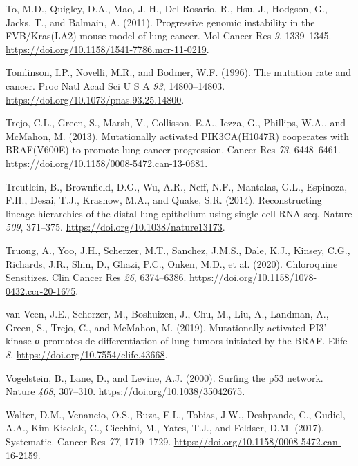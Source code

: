 \begin{CSLReferences}{0}{0}
\leavevmode{}%
To, M.D., Quigley, D.A., Mao, J.-H., Del Rosario, R., Hsu, J., Hodgson, G., Jacks, T., and Balmain, A. (2011). Progressive genomic instability in the FVB/Kras(LA2) mouse model of lung cancer. Mol Cancer Res \emph{9}, 1339--1345. \url{https://doi.org/10.1158/1541-7786.mcr-11-0219}.

\leavevmode{}%
Tomlinson, I.P., Novelli, M.R., and Bodmer, W.F. (1996). The mutation rate and cancer. Proc Natl Acad Sci U S A \emph{93}, 14800--14803. \url{https://doi.org/10.1073/pnas.93.25.14800}.

\leavevmode{}%
Trejo, C.L., Green, S., Marsh, V., Collisson, E.A., Iezza, G., Phillips, W.A., and McMahon, M. (2013). Mutationally activated PIK3CA(H1047R) cooperates with BRAF(V600E) to promote lung cancer progression. Cancer Res \emph{73}, 6448--6461. \url{https://doi.org/10.1158/0008-5472.can-13-0681}.

\leavevmode{}%
Treutlein, B., Brownfield, D.G., Wu, A.R., Neff, N.F., Mantalas, G.L., Espinoza, F.H., Desai, T.J., Krasnow, M.A., and Quake, S.R. (2014). Reconstructing lineage hierarchies of the distal lung epithelium using single-cell RNA-seq. Nature \emph{509}, 371--375. \url{https://doi.org/10.1038/nature13173}.

\leavevmode{}%
Truong, A., Yoo, J.H., Scherzer, M.T., Sanchez, J.M.S., Dale, K.J., Kinsey, C.G., Richards, J.R., Shin, D., Ghazi, P.C., Onken, M.D., et al. (2020). Chloroquine Sensitizes. Clin Cancer Res \emph{26}, 6374--6386. \url{https://doi.org/10.1158/1078-0432.ccr-20-1675}.

\leavevmode{}%
van Veen, J.E., Scherzer, M., Boshuizen, J., Chu, M., Liu, A., Landman, A., Green, S., Trejo, C., and McMahon, M. (2019). Mutationally-activated PI3'-kinase-α promotes de-differentiation of lung tumors initiated by the BRAF. Elife \emph{8}. \url{https://doi.org/10.7554/elife.43668}.

\leavevmode{}%
Vogelstein, B., Lane, D., and Levine, A.J. (2000). Surfing the p53 network. Nature \emph{408}, 307--310. \url{https://doi.org/10.1038/35042675}.

\leavevmode{}%
Walter, D.M., Venancio, O.S., Buza, E.L., Tobias, J.W., Deshpande, C., Gudiel, A.A., Kim-Kiselak, C., Cicchini, M., Yates, T.J., and Feldser, D.M. (2017). Systematic. Cancer Res \emph{77}, 1719--1729. \url{https://doi.org/10.1158/0008-5472.can-16-2159}.


\end{CSLReferences}
